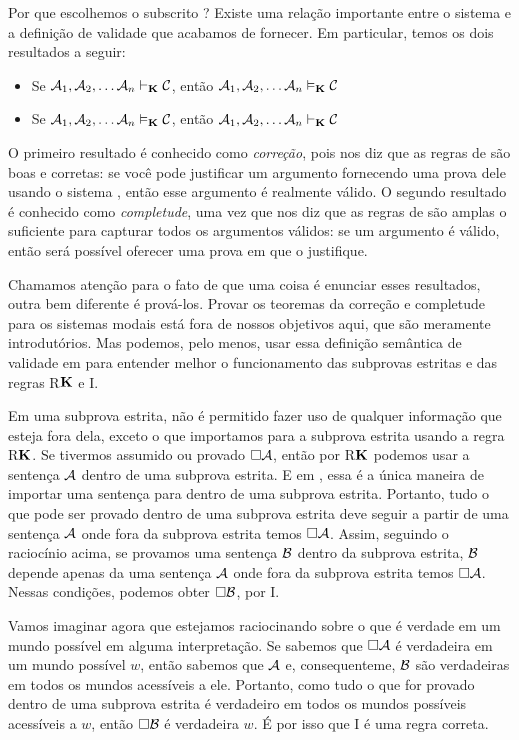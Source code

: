 Por que escolhemos o subscrito \mlK? Existe uma relação importante entre o sistema \mlK{} e a definição de validade que acabamos de fornecer. Em particular, temos os dois resultados a seguir:
\begin{itemize}
	\item Se $\mathcal{A}_1,\mathcal{A}_2, \dots \mathcal{A}_n\vdash_{\mathbf{K}}\mathcal{C}$, então $\mathcal{A}_1,\mathcal{A}_2, \dots \mathcal{A}_n\vDash_{\mathbf{K}}\mathcal{C}$
	\item Se $\mathcal{A}_1,\mathcal{A}_2, \dots \mathcal{A}_n\vDash_{\mathbf{K}}\mathcal{C}$, então $\mathcal{A}_1,\mathcal{A}_2, \dots \mathcal{A}_n\vdash_{\mathbf{K}}\mathcal{C}$
\end{itemize}
O primeiro resultado é conhecido como \emph{correção}, pois nos diz que as regras de \mlK{} são boas e corretas: se você pode justificar um argumento fornecendo uma prova dele usando o sistema \mlK, então esse argumento é realmente válido. O segundo resultado é conhecido como    \emph{completude}, uma vez que nos diz que as regras de \mlK{} são amplas o suficiente para capturar todos os argumentos válidos: se um argumento é válido, então será possível oferecer uma prova em \mlK{} que o justifique.
 

Chamamos atenção para o fato de que uma coisa é enunciar esses resultados, outra bem diferente é prová-los. Provar os teoremas da correção e completude para os sistemas modais está fora de nossos objetivos aqui, que são meramente introdutórios. Mas podemos, pelo menos, usar essa definição semântica de validade em  \mlK{} para entender melhor o funcionamento das subprovas estritas e das regras R$\mathbf{K}$ e  \ebox I.

Em uma subprova estrita, não  é permitido fazer uso de qualquer informação que esteja fora dela, exceto o que importamos para a subprova estrita usando a regra  R$\mathbf{K}$. Se tivermos assumido ou provado $\Box \mathcal{A}$, então por  R$\mathbf{K}$ podemos usar a sentença  $\mathcal{A}$ dentro de uma subprova estrita. E em \mlK, essa é a única maneira de importar uma sentença para dentro de uma subprova estrita.
 Portanto, tudo o que pode ser provado dentro de uma subprova estrita deve seguir a partir de uma  sentença  $\mathcal{A}$ onde fora da subprova estrita temos $\Box \mathcal{A}$.
 Assim, seguindo o raciocínio acima, se provamos uma sentença $\mathcal{B}$ dentro da subprova estrita, $\mathcal{B}$ depende apenas da  uma sentença $\mathcal{A}$ onde fora da subprova estrita temos $\Box\mathcal{A}$.  Nessas condições, podemos obter  $\Box\mathcal{B}$,  por \ebox I.
 
  Vamos imaginar agora que estejamos raciocinando sobre o que é verdade em um mundo possível em alguma interpretação. Se sabemos que $\Box\mathcal{A}$ é verdadeira em um mundo possível $w$, então sabemos que $\mathcal{A}$ e, consequenteme, $\mathcal{B}$  são verdadeiras em todos os mundos acessíveis a ele.
  Portanto, como tudo o que for provado dentro de uma subprova estrita é verdadeiro em todos os mundos possíveis acessíveis a $w$, então $\Box\mathcal{B}$ é verdadeira $w$. É por isso que \ebox I é uma regra correta.

